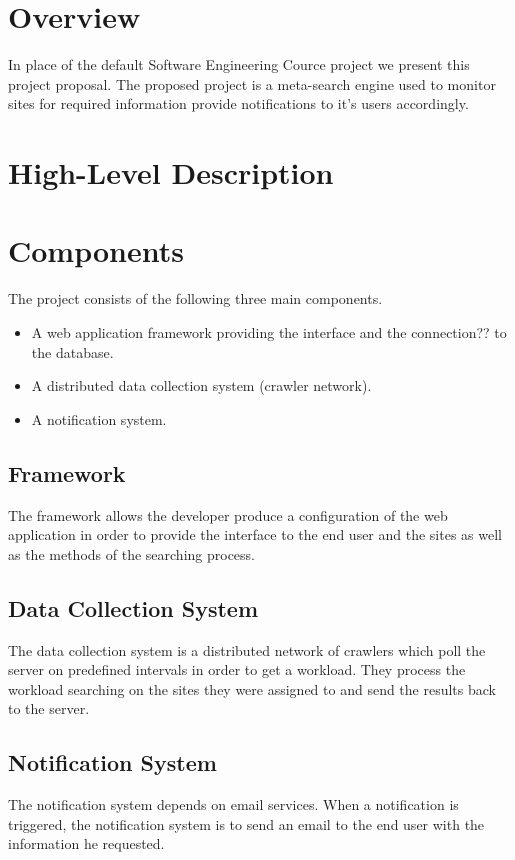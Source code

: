 \documentclass[a4paper,10pt]{article} \usepackage{anysize}
\begin{document}



\section{Overview}
    In place of the default Software Engineering Cource project we present this
    project proposal. The proposed project is a meta-search engine used to monitor
    sites for required information provide notifications to it's users accordingly. 

\section{High-Level Description}
\section{Components}
    The project consists of the following three main components.
    \begin{itemize}
        \item A web application framework providing the interface and the
            connection?? to the database.
        \item A distributed data collection system (crawler network).
        \item A notification system.
    \end{itemize}
    \subsection{Framework}
        The framework allows the developer produce a configuration of the web
        application in order to provide the interface to the end user and the
        sites as well as the methods of the searching process.
    \subsection{Data Collection System}
        The data collection system is a distributed network of crawlers which poll
        the server on predefined intervals in order to get a workload. They
        process the workload searching on the sites they were assigned to and send
        the results back to the server.
    \subsection{Notification System}
        The notification system depends on email services. When a notification is
        triggered, the notification system is to send an email to the end user
        with the information he requested.
\end{document}
